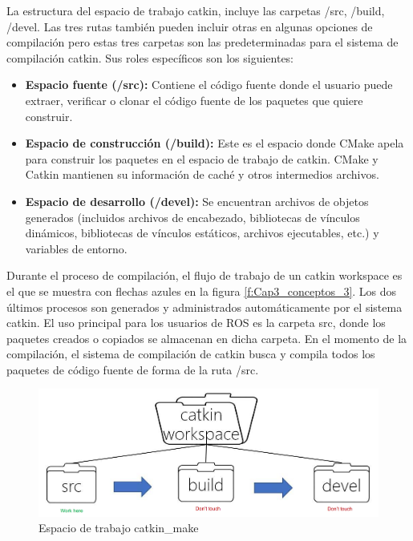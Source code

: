             La estructura del espacio de trabajo catkin, incluye las carpetas /src, /build, /devel. Las tres rutas también pueden incluir otras en algunas opciones de compilación pero estas tres carpetas son las predeterminadas para el sistema de compilación catkin. Sus roles específicos son los siguientes:

            \begin{itemize}
                \item {\textbf{Espacio fuente (/src):} Contiene el código fuente donde el usuario puede extraer, verificar o clonar el código fuente de los paquetes que quiere construir.}
                \item {\textbf{Espacio de construcción (/build):} Este es el espacio donde CMake apela para construir los paquetes en el espacio de trabajo de catkin. CMake y Catkin mantienen su información de caché y otros intermedios archivos.}
                \item {\textbf{Espacio de desarrollo (/devel):} Se encuentran archivos de objetos generados (incluidos archivos de encabezado, bibliotecas de vínculos dinámicos, bibliotecas de vínculos estáticos, archivos ejecutables, etc.) y variables de entorno.}
            \end{itemize}


            Durante el proceso de compilación, el flujo de trabajo de un catkin workspace es el que se muestra con flechas azules en la figura \eqref{f:Cap3_conceptos_3}. Los dos últimos procesos son generados y administrados automáticamente por el sistema catkin. El uso principal para los usuarios de ROS es la carpeta src\/, donde los paquetes creados o copiados se almacenan en dicha carpeta. En el momento de la compilación, el sistema de compilación de catkin busca y compila todos los paquetes de código fuente de forma de la ruta /src\/.

            \begin{figure}[htb]
                \centering
                \includegraphics[width=0.8\linewidth]{Main/Chapter3/Images3/n_s_a_3.png}
                \caption{Espacio de trabajo catkin\_make \cite{cmake_blogcsdn}}
                \label{f:Cap3_conceptos_3}
            \end{figure} 
            
